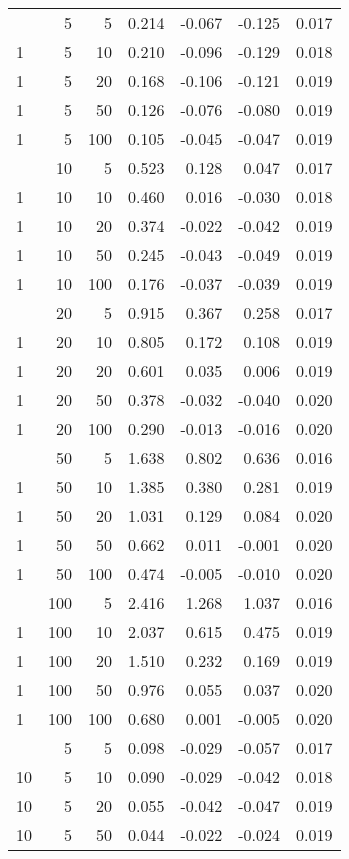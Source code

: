 \begin{table}
\begin{tabular}[t]{lrrrrrr}
\addlinespace
1 & 5 & 5 & 0.214 & -0.067 & -0.125 & 0.017\\
1 & 5 & 10 & 0.210 & -0.096 & -0.129 & 0.018\\
1 & 5 & 20 & 0.168 & -0.106 & -0.121 & 0.019\\
1 & 5 & 50 & 0.126 & -0.076 & -0.080 & 0.019\\
1 & 5 & 100 & 0.105 & -0.045 & -0.047 & 0.019\\
\addlinespace
1 & 10 & 5 & 0.523 & 0.128 & 0.047 & 0.017\\
1 & 10 & 10 & 0.460 & 0.016 & -0.030 & 0.018\\
1 & 10 & 20 & 0.374 & -0.022 & -0.042 & 0.019\\
1 & 10 & 50 & 0.245 & -0.043 & -0.049 & 0.019\\
1 & 10 & 100 & 0.176 & -0.037 & -0.039 & 0.019\\
\addlinespace
1 & 20 & 5 & 0.915 & 0.367 & 0.258 & 0.017\\
1 & 20 & 10 & 0.805 & 0.172 & 0.108 & 0.019\\
1 & 20 & 20 & 0.601 & 0.035 & 0.006 & 0.019\\
1 & 20 & 50 & 0.378 & -0.032 & -0.040 & 0.020\\
1 & 20 & 100 & 0.290 & -0.013 & -0.016 & 0.020\\
\addlinespace
1 & 50 & 5 & 1.638 & 0.802 & 0.636 & 0.016\\
1 & 50 & 10 & 1.385 & 0.380 & 0.281 & 0.019\\
1 & 50 & 20 & 1.031 & 0.129 & 0.084 & 0.020\\
1 & 50 & 50 & 0.662 & 0.011 & -0.001 & 0.020\\
1 & 50 & 100 & 0.474 & -0.005 & -0.010 & 0.020\\
\addlinespace
1 & 100 & 5 & 2.416 & 1.268 & 1.037 & 0.016\\
1 & 100 & 10 & 2.037 & 0.615 & 0.475 & 0.019\\
1 & 100 & 20 & 1.510 & 0.232 & 0.169 & 0.019\\
1 & 100 & 50 & 0.976 & 0.055 & 0.037 & 0.020\\
1 & 100 & 100 & 0.680 & 0.001 & -0.005 & 0.020\\
\addlinespace
10 & 5 & 5 & 0.098 & -0.029 & -0.057 & 0.017\\
10 & 5 & 10 & 0.090 & -0.029 & -0.042 & 0.018\\
10 & 5 & 20 & 0.055 & -0.042 & -0.047 & 0.019\\
10 & 5 & 50 & 0.044 & -0.022 & -0.024 & 0.019\\

\end{tabular}
\end{table}

